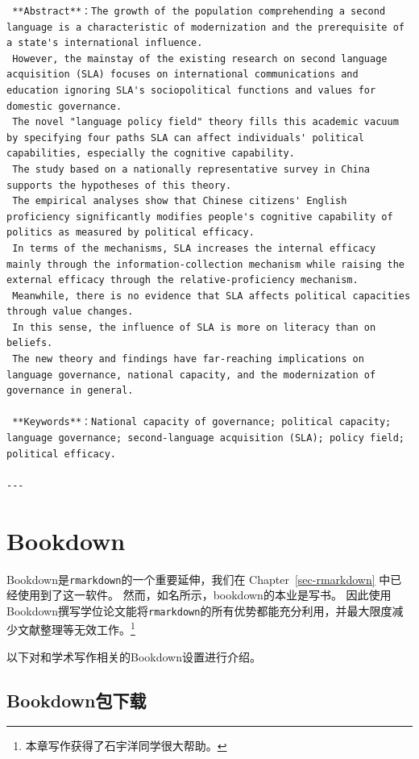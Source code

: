 \documentclass[
  letterpaper,
  DIV=11,
  numbers=noendperiod,
  oneside]{scrreprt}
\begin{document}
\begin{verbatim}
 **Abstract**：The growth of the population comprehending a second language is a characteristic of modernization and the prerequisite of a state's international influence. 
 However, the mainstay of the existing research on second language acquisition (SLA) focuses on international communications and education ignoring SLA's sociopolitical functions and values for domestic governance.
 The novel "language policy field" theory fills this academic vacuum by specifying four paths SLA can affect individuals' political capabilities, especially the cognitive capability. 
 The study based on a nationally representative survey in China supports the hypotheses of this theory. 
 The empirical analyses show that Chinese citizens' English proficiency significantly modifies people's cognitive capability of politics as measured by political efficacy. 
 In terms of the mechanisms, SLA increases the internal efficacy mainly through the information-collection mechanism while raising the external efficacy through the relative-proficiency mechanism. 
 Meanwhile, there is no evidence that SLA affects political capacities through value changes. 
 In this sense, the influence of SLA is more on literacy than on beliefs. 
 The new theory and findings have far-reaching implications on language governance, national capacity, and the modernization of governance in general.
 
 **Keywords**：National capacity of governance; political capacity; language governance; second-language acquisition (SLA); policy field; political efficacy.

---
\end{verbatim}


\hypertarget{sec-bookdown}{%
\chapter{Bookdown}\label{sec-bookdown}}

Bookdown是\texttt{rmarkdown}的一个重要延伸，我们在
Chapter~\ref{sec-rmarkdown} 中已经使用到了这一软件。
然而，如名所示，bookdown的本业是写书。
因此使用Bookdown撰写学位论文能将\texttt{rmarkdown}的所有优势都能充分利用，并最大限度减少文献整理等无效工作。\footnote{本章写作获得了石宇洋同学很大帮助。}

以下对和学术写作相关的Bookdown设置进行介绍。

\hypertarget{bookdownux5305ux4e0bux8f7d}{%
\section{Bookdown包下载}\label{bookdownux5305ux4e0bux8f7d}}
\end{document}
